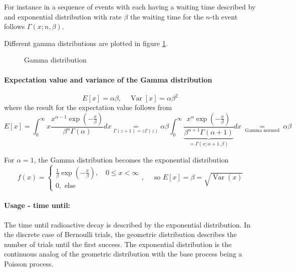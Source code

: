For instance in a sequence of events with each having a waiting time described
by and exponential distribution with rate $\beta$ the waiting time for the $n$-th event
follows $\Gamma(x;n,\beta)$.

Different gamma distributions are plotted in figure \ref{fig:gamma}.

\begin{figure}[!htb]
    \centering
    
    \caption{Gamma distribution}
    \label{fig:gamma}
\end{figure}

\paragraph*{Expectation value and variance of the Gamma distribution}
\begin{equation}
    E[x]=\alpha \beta, \quad \operatorname{Var}[x]=\alpha \beta^2
\end{equation}
where the result for the expectation value follows from
\begin{equation}
    E[x]=\int_0^{\infty} x \frac{x^{\alpha-1} \exp \left(-\frac{x}{\beta}\right)}{\beta^\alpha \Gamma(\alpha)} d x \underset{\Gamma(z+1)=z \Gamma(z)}{=} \alpha \beta \int_0^{\infty} \underbrace{\frac{x^\alpha \exp \left(-\frac{x}{\beta}\right)}{\beta^{\alpha+1} \Gamma(\alpha+1)}}_{=\Gamma(x;\alpha+1,\beta)} d x \underset{\text { Gamma normed }}{=} \alpha \beta
\end{equation}

For $\alpha = 1$, the Gamma distribution becomes the exponential distribution
\begin{equation}
    f(x)=\left\{\begin{array}{c}
    \frac{1}{\beta} \exp \left(-\frac{x}{\beta}\right), \quad 0 \leq x<\infty\\
    0, \text { else }
    \end{array}\right., \quad \text { so } E[x]=\beta=\sqrt{\operatorname{Var}(x)} 
\end{equation}
\paragraph{Usage - time until:} The time until radioactive decay is described by the exponential distribution.
In the discrete case of Bernoulli trials, the geometric distribution describes the number of trials until the first success.
The exponential distribution is the continuous analog of the geometric distribution with the base process being a Poisson process.


